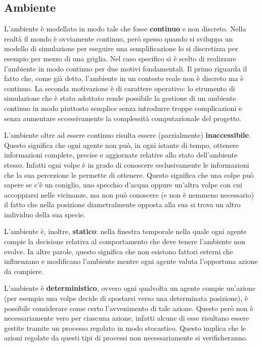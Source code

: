 \documentclass[11pt]{article}
\begin{document}
\subsection{Ambiente}
L'ambiente è modellato in modo tale che fosse \textbf{continuo} e non discreto. Nella realtà il mondo è ovviamente continuo, però spesso quando si sviluppa un modello di simulazione per eseguire una semplificazione lo si discretizza per esempio per mezzo di una griglia. Nel caso specifico si è scelto di realizzare l'ambiente in modo continuo per due motivi fondamentali. Il primo riguarda il fatto che, come già detto, l'ambiente in un contesto reale non è discreto ma è continuo. La seconda motivazione è di carattere operativo: lo strumento di simulazione che è stato adottato rende possibile la gestione di un ambiente continuo in modo piuttosto semplice senza introdurre troppe complicazioni e senza aumentare eccessivamente la complessità computazionale del progetto. 

L'ambiente oltre ad essere continuo risulta essere (parzialmente) \textbf{inaccessibile}. Questo significa che ogni agente non può, in ogni istante di tempo, ottenere informazioni complete, precise e aggiornate relative allo stato dell'ambiente stesso. Infatti ogni volpe è in grado di conoscere esclusivamente le informazioni che la sua percezione le permette di ottenere. Questo significa che una colpe può sapere se c'è un coniglio, uno specchio d'acqua oppure un'altra volpe con cui accoppiarsi nelle vicinanze, ma non può conoscere (e non è nemmeno necessario) il fatto che nella posizione diametralmente opposta alla sua si trova un altro individuo della sua specie. 

L'ambiente è, inoltre, \textbf{statico}: nella finestra temporale nella quale ogni agente compie la decisione relativa al comportamento che deve tenere l'ambiente non evolve. In altre parole, questo significa che non esistono fattori esterni che influenzano e modificano l'ambiente mentre ogni agente valuta l'opportuna azione da compiere. 

L'ambiente è \textbf{deterministico}, ovvero ogni qualvolta un agente compie un'azione (per esempio una volpe decide di spostarsi verso una determinata posizione), è possibile considerare come certo l'avvenimento di tale azione. Questo però non è necessariamente vero per ciascuna azione, infatti alcune di esse risultano essere gestite tramite un processo regolato in modo stocastico. Questo implica che le azioni regolate da questi tipi di processi non necessariamente si verificheranno. 
\end{document}
